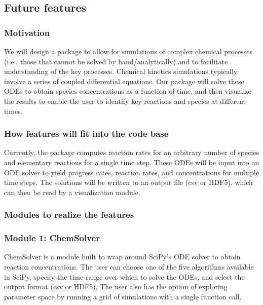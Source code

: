 \documentclass[12pt]{article}
\begin{document}
\subsection{Future features}
\subsubsection{Motivation}

We will design a package to allow for simulations of complex chemical processes (i.e., those that cannot be solved by hand/analytically) and to facilitate understanding of the key processes. Chemical kinetics simulations typically involve a series of coupled differential equations. Our package will solve these ODEs to obtain species concentrations as a function of time, and then visualize the results to enable the user to identify key reactions and species at different times.

\subsubsection{How features will fit into the code base}

Currently, the package computes reaction rates for an arbitrary number of species and elementary reactions for a single time step. These ODEs will be input into an ODE solver to yield progress rates, reaction rates, and concentrations for multiple time steps. The solutions will be written to an output file (csv or HDF5), which can then be read by a visualization module. 

\subsubsection{Modules to realize the features}

\subsubsection*{Module 1: ChemSolver}


ChemSolver is a module built to wrap around SciPy's ODE solver to obtain reaction concentrations. The user can choose one of the five algorithms available in SciPy, specify the time range over which to solve the ODEs, and select the output format (csv or HDF5). The user also has the option of exploring parameter space by running a grid of simulations with a single function call. 
\end{document}
